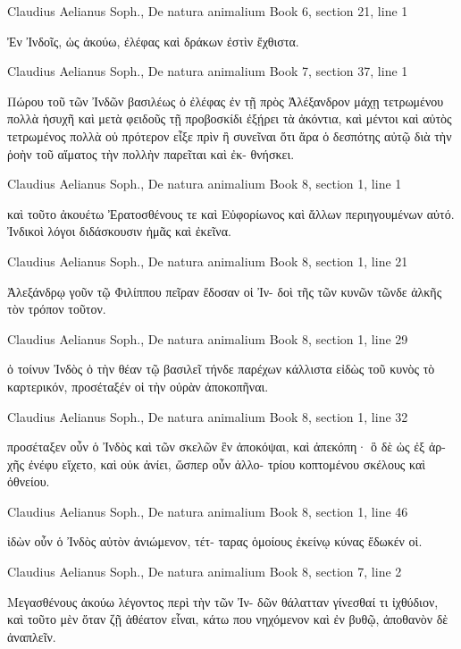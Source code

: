 \documentclass[12pt,letterpaper,twoside,final]{memoir}
\begin{document}
\begin{greek}
Claudius Aelianus Soph., De natura animalium 
Book 6, section 21, line 1

Ἐν Ἰνδοῖς, ὡς ἀκούω, ἐλέφας καὶ δράκων ἐστὶν 
ἔχθιστα. 



Claudius Aelianus Soph., De natura animalium 
Book 7, section 37, line 1

Πώρου τοῦ τῶν Ἰνδῶν βασιλέως ὁ ἐλέφας ἐν τῇ 
πρὸς Ἀλέξανδρον μάχῃ τετρωμένου πολλὰ ἡσυχῆ 
καὶ μετὰ φειδοῦς τῇ προβοσκίδι ἐξῄρει τὰ ἀκόντια, 
καὶ μέντοι καὶ αὐτὸς τετρωμένος πολλὰ οὐ πρότερον 
εἶξε πρὶν ἢ συνεῖναι ὅτι ἄρα ὁ δεσπότης αὐτῷ διὰ 
τὴν ῥοὴν τοῦ αἵματος τὴν πολλὴν παρεῖται καὶ ἐκ-
θνήσκει. 



Claudius Aelianus Soph., De natura animalium 
Book 8, section 1, line 1

                                                       καὶ   
τοῦτο ἀκουέτω Ἐρατοσθένους τε καὶ Εὐφορίωνος 
καὶ ἄλλων περιηγουμένων αὐτό. 
 Ἰνδικοὶ λόγοι διδάσκουσιν ἡμᾶς καὶ ἐκεῖνα. 



Claudius Aelianus Soph., De natura animalium 
Book 8, section 1, line 21

Ἀλεξάνδρῳ γοῦν τῷ Φιλίππου πεῖραν ἔδοσαν οἱ Ἰν-
δοὶ τῆς τῶν κυνῶν τῶνδε ἀλκῆς τὸν τρόπον τοῦτον. 



Claudius Aelianus Soph., De natura animalium 
Book 8, section 1, line 29

                                                         ὁ 
τοίνυν Ἰνδὸς ὁ τὴν θέαν τῷ βασιλεῖ τήνδε παρέχων 
κάλλιστα εἰδὼς τοῦ κυνὸς τὸ καρτερικόν, προσέταξέν 
οἱ τὴν οὐρὰν ἀποκοπῆναι. 



Claudius Aelianus Soph., De natura animalium 
Book 8, section 1, line 32

                      προσέταξεν οὖν ὁ Ἰνδὸς καὶ τῶν 
σκελῶν ἓν ἀποκόψαι, καὶ ἀπεκόπη· ὃ δὲ ὡς ἐξ ἀρ-
χῆς ἐνέφυ εἴχετο, καὶ οὐκ ἀνίει, ὥσπερ οὖν ἀλλο-
τρίου κοπτομένου σκέλους καὶ ὀθνείου. 



Claudius Aelianus Soph., De natura animalium 
Book 8, section 1, line 46

            ἰδὼν οὖν ὁ Ἰνδὸς αὐτὸν ἀνιώμενον, τέτ-
ταρας ὁμοίους ἐκείνῳ κύνας ἔδωκέν οἱ. 



Claudius Aelianus Soph., De natura animalium 
Book 8, section 7, line 2

Μεγασθένους ἀκούω λέγοντος περὶ τὴν τῶν Ἰν-
δῶν θάλατταν γίνεσθαί τι ἰχθύδιον, καὶ τοῦτο μὲν 
ὅταν ζῇ ἀθέατον εἶναι, κάτω που νηχόμενον καὶ ἐν 
βυθῷ, ἀποθανὸν δὲ ἀναπλεῖν. 




\end{greek}
\end{document}
